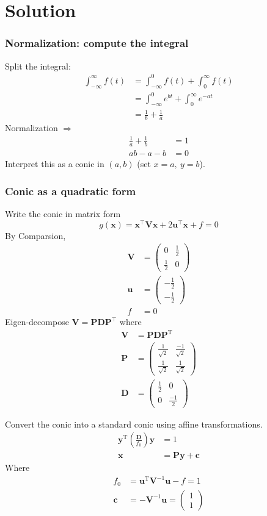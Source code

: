 \documentclass{beamer}
\providecommand{\brak}[1]{\ensuremath{\left(#1\right)}}
\theoremstyle{remark}
\newcommand{\myvec}[1]{\ensuremath{\begin{pmatrix}#1\end{pmatrix}}}
\let\vec\mathbf
\numberwithin{equation}{section}
\begin{document}
\section{Solution}
\begin{frame}
\frametitle{Normalization: compute the integral}
Split the integral:
\begin{align}
	\int_{-\infty}^{\infty} f(t) &= \int_{-\infty}^{0} f(t) + \int_{0}^{\infty} f(t)\\
	&= \int_{-\infty}^{0} e^{bt} + \int_{0}^{\infty} e^{-at}\\
	&= \frac{1}{b} + \frac{1}{a} \label{integral_result}
	\end{align}
Normalization $\Rightarrow$
\begin{align}
	\frac{1}{a} + \frac{1}{b} &= 1\\
	ab - a - b &= 0 \label{conic_ab}
\end{align}
Interpret this as a conic in $(a,b)$ (set $x=a,\ y=b$).
\end{frame}

\begin{frame}
\frametitle{Conic as a quadratic form}
Write the conic in matrix form
\[
g(\vec{x}) = \vec{x}^\top \vec{V} \vec{x} + 2\vec{u}^\top \vec{x} + f = 0
\]
By Comparsion,
\begin{align}
	\vec{V} &= \myvec{0 & \frac{1}{2} \\ \frac{1}{2} & 0}\\
	\vec{u} &= \myvec{-\frac{1}{2} \\ -\frac{1}{2}}\\
	f &= 0
\end{align}
Eigen-decompose $\vec{V}=\vec{P}\vec{D}\vec{P}^\top$ where
\begin{align}
		\vec{V} &= \vec{PDP}^\text{T}\\
		\vec{P} &= \myvec{\frac{1}{\sqrt{2}} & \frac{-1}{\sqrt{2}} \\ \frac{1}{\sqrt{2}} & \frac{1}{\sqrt{2}}}\\
		\vec{D} &= \myvec{\frac{1}{2} & 0 \\ 0 & \frac{-1}{2}}
	\end{align}
\end{frame}




\begin{frame}
Convert the conic into a standard conic using affine transformations.
	\begin{align}
		\vec{y}^\text{T}\brak{\frac{\vec{D}}{f_0}}\vec{y} &= 1\\
		\vec{x} &= \vec{Py} + \vec{c} \label{t1}
	\end{align}
	Where 
	\begin{align}
		f_0 &= \vec{u}^\text{T}\vec{V}^{-1}\vec{u} - f = 1\\
		\vec{c} &= -\vec{V}^{-1}\vec{u} = \myvec{1 \\ 1}
	\end{align}
	
\end{frame}
\end{document}
